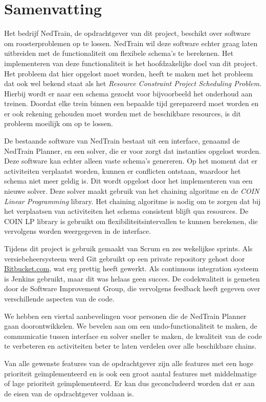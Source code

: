 \section*{Samenvatting}

Het bedrijf NedTrain, de opdrachtgever van dit project, beschikt over software om roosterproblemen op te lossen. NedTrain wil deze software echter graag laten uitbreiden met de functionaliteit om flexibele schema's te berekenen. Het implementeren van deze functionaliteit is het hoofdzakelijke doel van dit project. Het probleem dat hier opgelost moet worden, heeft te maken met het probleem dat ook wel bekend staat als het \emph{Resource Constraint Project Scheduling Problem}. Hierbij wordt er naar een schema gezocht voor bijvoorbeeld het onderhoud aan treinen. Doordat elke trein binnen een bepaalde tijd gerepareerd moet worden en er ook rekening gehouden moet worden met de beschikbare resources, is dit probleem moeilijk om op te lossen.

De bestaande software van NedTrain bestaat uit een interface, genaamd de NedTrain Planner, en een solver, die er voor zorgt dat instanties opgelost worden. Deze software kan echter alleen vaste schema's genereren. Op het moment dat er activiteiten verplaatst worden, kunnen er conflicten ontstaan, waardoor het schema niet meer geldig is. Dit wordt opgelost door het implementeren van een nieuwe solver. Deze solver maakt gebruik van het chaining algoritme en de \emph{COIN Linear Programming} library. Het chaining algoritme is nodig om te zorgen dat bij het verplaatsen van activiteiten het schema consistent blijft qua resources. De COIN LP library is gebruikt om flexibiliteitsintervallen te kunnen berekenen, die vervolgens worden weergegeven in de interface. 

Tijdens dit project is gebruik gemaakt van Scrum en zes wekelijkse sprints. Als versiebeheersysteem werd Git gebruikt op een private repository gehost door \href{http://bitbucket.com}{Bitbucket.com}, wat erg prettig heeft gewerkt. Als continuous integration systeem is Jenkins gebruikt, maar dit was helaas geen succes. De codekwaliteit is gemeten door de Software Improvement Group, die vervolgens feedback heeft gegeven over verschillende aspecten van de code. 

We hebben een viertal aanbevelingen voor personen die de NedTrain Planner gaan doorontwikkelen. We bevelen aan om een undo-functionaliteit te maken, de communicatie tussen interface en solver sneller te maken, de kwaliteit van de code te verbeteren en activiteiten beter te laten verdelen over alle beschikbare chains.

Van alle gewenste features van de opdrachtgever zijn alle features met een hoge prioriteit ge\"implementeerd en is ook een groot aantal features met middelmatige of lage prioriteit ge\"implementeerd. Er kan dus geconcludeerd worden dat er aan de eisen van de opdrachtgever voldaan is.
